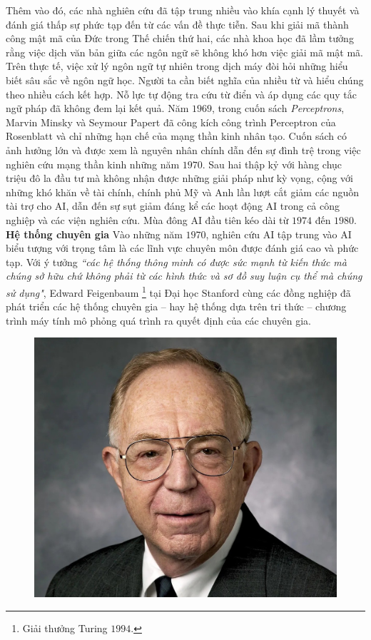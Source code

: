 \begin{multicols}{2}
	\vskip 0.1cm
	Thêm vào đó, các nhà nghiên cứu đã tập trung nhiều vào khía cạnh lý thuyết và đánh giá thấp sự phức tạp đến từ các vấn đề thực tiễn. Sau khi giải mã thành công mật mã của Đức trong Thế chiến thứ hai, các nhà khoa học đã lầm tưởng rằng việc dịch văn bản giữa các ngôn ngữ sẽ không khó hơn việc giải mã mật mã. Trên thực tế, việc xử lý ngôn ngữ tự nhiên trong dịch máy đòi hỏi những hiểu biết sâu sắc về ngôn ngữ học. Người ta cần biết nghĩa của nhiều từ và hiểu chúng theo nhiều cách kết hợp. Nỗ lực tự động tra cứu từ điển và áp dụng các quy tắc ngữ pháp đã không đem lại kết quả. 
	\vskip 0.1cm
	Năm $1969$, trong cuốn sách \textit{Perceptrons}, Marvin Minsky và Seymour Papert đã công kích công trình Perceptron của Rosenblatt và chỉ những hạn chế của mạng thần kinh nhân tạo. Cuốn sách có ảnh hưởng lớn và được xem là nguyên nhân chính dẫn đến sự đình trệ trong việc nghiên cứu mạng thần kinh những năm $1970$.
	\vskip 0.1cm
	Sau hai thập kỷ với hàng chục triệu đô la đầu tư mà không nhận được những giải pháp như kỳ vọng, cộng với những khó khăn về tài chính, chính phủ Mỹ và Anh lần lượt cắt giảm các nguồn tài trợ cho AI, dẫn đến sự sụt giảm đáng kể các hoạt động AI trong cả công nghiệp và các viện nghiên cứu. Mùa đông AI đầu tiên kéo dài từ $1974$ đến $1980$.
	\vskip 0.1cm
	\textbf{\color{cackithi}Hệ thống chuyên gia}
	\vskip 0.1cm
	Vào những năm $1970$, nghiên cứu AI tập trung vào AI biểu tượng với trọng tâm là các lĩnh vực chuyên môn được đánh giá cao và phức tạp. Với ý tưởng \textit{``các hệ thống thông minh có được sức mạnh từ kiến thức mà chúng sở hữu chứ không phải từ các hình thức và sơ đồ suy luận cụ thể mà chúng sử dụng"}, Edward Feigenbaum \footnote{\color{cackithi}Giải thưởng Turing $1994$.} tại Đại học Stanford cùng các đồng nghiệp đã phát triển các hệ thống chuyên gia -- hay hệ thống dựa trên tri thức -- chương trình máy tính mô phỏng quá trình ra quyết định của các chuyên gia. 
	\begin{figure}[H]
		\vspace*{-5pt}
		\centering
		\captionsetup{labelformat= empty, justification=centering}
		\includegraphics[width= 1\linewidth]{Edward-Feigenbaum.jpeg}

\end{figure}
\end{multicols}
